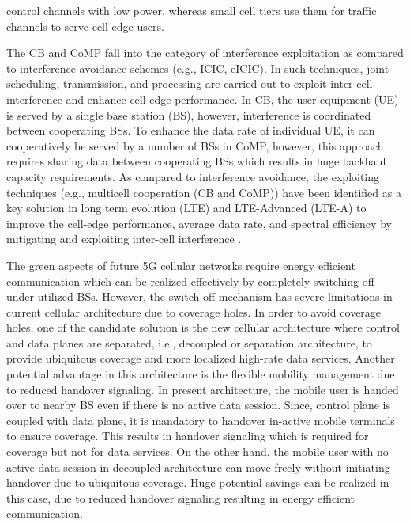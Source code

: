 \documentclass[article,10pt,twocolumn]{IEEEtran}
\begin{document}
control channels with low power, whereas small cell tiers use them for traffic channels to serve cell-edge users.

The CB and CoMP fall into the category of interference exploitation as compared to interference avoidance schemes (e.g., ICIC, eICIC). In such techniques, joint scheduling, transmission, and processing are carried out to exploit inter-cell interference and enhance cell-edge performance. In CB, the user equipment (UE) is served by a single base station (BS), however, interference is coordinated between cooperating BSs. To enhance the data rate of individual UE, it can cooperatively be served by a number of BSs in CoMP, however, this approach requires sharing data between cooperating BSs which results in huge backhaul capacity requirements. As compared to interference avoidance, the exploiting techniques (e.g., multicell cooperation (CB and CoMP)) have been identified as a key solution in long term evolution (LTE) and LTE-Advanced (LTE-A) to improve the cell-edge performance, average data rate, and spectral efficiency by mitigating and exploiting inter-cell interference \citep{3gpp.36.819, marsch_coordinated_2011, 4657145}.

The green aspects of future 5G cellular networks require energy efficient communication which can be realized effectively by completely switching-off under-utilized BSs. However, the switch-off mechanism has severe limitations in current cellular architecture due to coverage holes. In order to avoid coverage holes, one of the candidate solution is the new cellular architecture where control and data planes are separated, i.e., decoupled or separation architecture, to provide ubiquitous coverage and more localized high-rate data services. Another potential advantage in this architecture is the flexible mobility management due to reduced handover signaling. In present architecture, the mobile user is handed over to nearby BS even if there is no active data session. Since, control plane is coupled with data plane, it is mandatory to handover in-active mobile terminals to ensure coverage. This results in handover signaling which is required for coverage but not for data services. On the other hand, the mobile user with no active data session in decoupled architecture can move freely without initiating handover due to ubiquitous coverage. Huge potential savings can be realized in this case, due to reduced handover signaling resulting in energy efficient communication.
\end{document}
